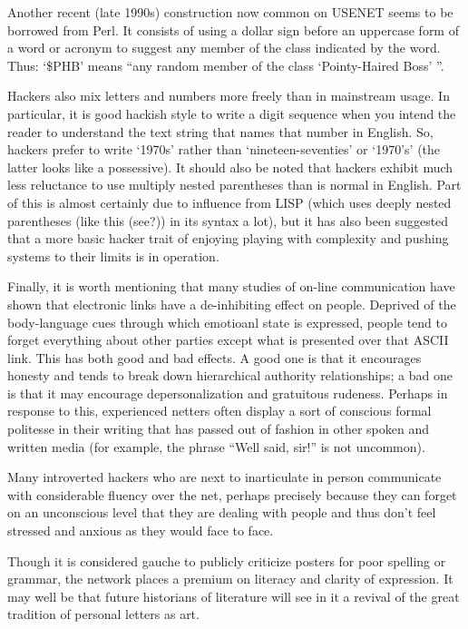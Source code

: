 Another recent (late 1990s) construction now common on USENET seems to be
borrowed from Perl. It consists of using a dollar sign before an uppercase form
of a word or acronym to suggest any  member of the class
indicated by the word. Thus: `\$PHB' means ``any random member of the class
`Pointy-Haired Boss' ''.

Hackers also mix letters and numbers more freely than in mainstream usage. In
particular, it is good hackish style to write a digit sequence when you intend
the reader to understand the text string that names that number in English. So,
hackers prefer to write `1970s' rather than `nineteen-seventies' or `1970's'
(the latter looks like a possessive).  It should also be noted that hackers
exhibit much less reluctance to use multiply nested parentheses than is normal
in English. Part of this is almost certainly due to influence from LISP (which
uses deeply nested parentheses (like this (see?)) in its syntax a lot), but it
has also been suggested that a more basic hacker trait of enjoying playing with
complexity and pushing systems to their limits is in operation.

Finally, it is worth mentioning that many studies of on-line communication have
shown that electronic links have a de-inhibiting effect on people. Deprived of
the body-language cues through which emotioanl state is expressed, people tend
to forget everything about other parties except what is presented over that
ASCII link. This has both good and bad effects. A good one is that it
encourages honesty and tends to break down hierarchical authority
relationships; a bad one is that it may encourage depersonalization and
gratuitous rudeness. Perhaps in response to this, experienced netters often
display a sort of conscious formal politesse in their writing that has passed
out of fashion in other spoken and written media (for example, the phrase
``Well said, sir!'' is not uncommon).

Many introverted hackers who are next to inarticulate in person communicate
with considerable fluency over the net, perhaps precisely because they can
forget on an unconscious level that they are dealing with people and thus don't
feel stressed and anxious as they would face to face.

Though it is considered gauche to publicly criticize posters for poor spelling
or grammar, the network places a premium on literacy and clarity of expression.
It may well be that future historians of literature will see in it a revival of
the great tradition of personal letters as art.

